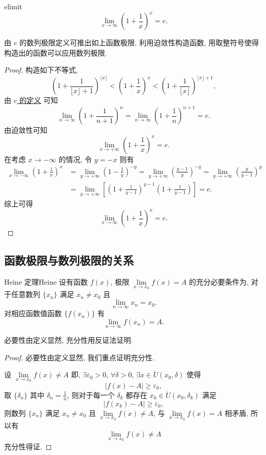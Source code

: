 \documentclass[cn,toc=twocol]{elegantbook}
\begin{document}
\begin{theorem}{}{elimit}
\[
	\lim_{x \to \infty} \left(1 + \frac{1}{x}\right)^x = e.
\]
\end{theorem}
\begin{idea*}
	由 $e$ 的数列极限定义可推出如上函数极限, 利用迫敛性构造函数, 用取整符号使得构造出的函数可以应用数列极限. 
\end{idea*}
\begin{proof}
	构造如下不等式, 
	\[
		\left(1 + \frac{1}{\lfloor x \rfloor + 1}\right)^{\lfloor x \rfloor} < \left(1 + \frac{1}{x}\right)^{x} < \left(1 + \frac{1}{\lfloor x \rfloor}\right)^{\lfloor x \rfloor + 1},
	\]
	由 \hyperref[def:e]{$e$ 的定义} 可知
	\[
		\lim_{n \to \infty} (1 + \frac{1}{n + 1})^n = \lim_{n \to \infty} (1 + \frac{1}{n})^{n+1} = e.
	\]
	由迫敛性可知
	\[
		\lim_{x \to +\infty} (1 + \frac{1}{x})^x = e.
	\]
	在考虑 $x \to -\infty$ 的情况, 令 $y = -x$ 则有
	\[
	\begin{aligned}
		\lim_{x \to -\infty} \left(1 + \frac{1}{x}\right)^x &= \lim_{y \to +\infty} \left(1 - \frac{1}{y}\right)^{-y} = \lim_{y \to +\infty} \left(\frac{y - 1}{y}\right)^{-y} = \lim_{y \to +\infty} \left(\frac{y}{y - 1}\right)^{y}\\
		&= \lim_{y \to +\infty} \left[\left(1 + \frac{1}{y - 1}\right)^{y - 1}\left(1 + \frac{1}{y - 1}\right)\right] = e.
	\end{aligned}
	\]
	综上可得
	\[
		\lim_{x \to \infty} \left(1 + \frac{1}{x}\right)^x = e.
	\]
\end{proof}

\subsection{函数极限与数列极限的关系}

\begin{theorem}{Heine 定理}{Heine}
	设有函数 $f(x)$, 极限 $\lim\limits_{x \to x_0} f(x) = A$ 的充分必要条件为, 对于任意数列 $\{x_n\}$ 满足 $x_n \neq x_0$ 且
	\[
		\lim_{n \to \infty} x_n = x_0.
	\]
	对相应函数值函数 $\{f(x_n)\}$ 有
	\[
		\lim_{n \to \infty} f(x_n) = A.
	\]
\end{theorem}

\begin{idea*}
必要性由定义显然, 充分性用反证法证明.	
\end{idea*}

\begin{proof}
	必要性由定义显然, 我们重点证明充分性.
	
	设 $\lim\limits_{x \to x_0} f(x) \neq A$ 即, $\exists \varepsilon_0 > 0$, $\forall \delta > 0$, $\exists x \in \mathring{U}(x_0,\delta)$ 使得
	\[
		\lvert f(x) - A \rvert \ge \varepsilon_0,
	\]
	取 $\{\delta_n\}$ 其中 $\delta_n = \frac{1}{n}$, 则对于每一个 $\delta_k$ 都存在 $x_k \in \mathring{U}(x_0,\delta_k)$ 满足
	 \[
		\lvert f(x_k) - A \rvert \ge \varepsilon_0,
	\]
	则数列 $\{x_n\}$ 满足 $x_n \neq x_0$ 且 $\lim\limits_{x \to x_0} f(x) \neq A$, 与 $\lim\limits_{x \to x_0} f(x) = A$ 相矛盾, 所以有
	\[
	\lim\limits_{x \to x_0} f(x) \neq A
	\]
	充分性得证.
\end{proof}
\end{document}
